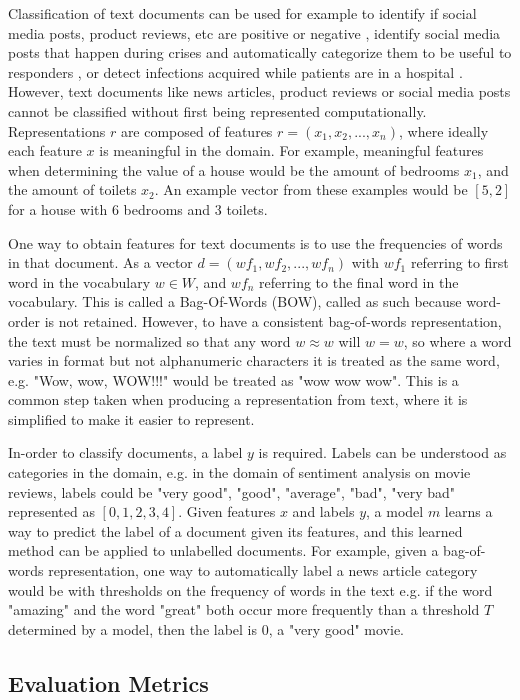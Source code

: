 Classification of text documents can be used for example to identify if social media posts, product reviews, etc are positive or negative \cite{Burel2018},  identify social media posts that happen during crises and automatically categorize them to be useful to responders \cite{Burel2018},  or detect infections acquired while patients are in a hospital . However, text documents like news articles, product reviews or social media posts cannot be classified without first being represented computationally.  Representations $r$ are composed of features $r = (x_1, x_2, ..., x_n)$, where ideally each feature $x$  is meaningful in the domain. For example, meaningful features when determining the  value of a house would be the amount of bedrooms $x_1$, and the amount of toilets $x_2$. An example vector from these examples would be $[5,2]$ for a house with 6 bedrooms and 3 toilets.

One way to obtain features for text documents is to use the frequencies of words in that document. As a vector $d = ({wf}_1, {wf}_2, ..., {wf}_n)$ with ${wf}_1$ referring to first word in the vocabulary $w \in W$, and ${wf}_n$  referring to the final word in the vocabulary. This is called a Bag-Of-Words (BOW), called as such because word-order is not retained. However, to have a consistent bag-of-words representation, the text must be normalized so that any word $w \approx w$ will  $w = w$, so where a word varies in format but not alphanumeric characters it is treated as the same word, e.g. "Wow, wow, WOW!!!" would be treated as  "wow wow wow". This is a common step taken when producing a representation from text, where it is simplified to make it easier to represent.

In-order to classify documents, a label $y$ is required. Labels can be understood as categories in the domain, e.g. in the domain of sentiment analysis on movie reviews, labels could be "very good", "good", "average", "bad", "very bad" represented as $[0, 1, 2, 3, 4]$. Given features $x$ and labels $y$, a model $m$ learns a way to predict the label of a document given its features, and this learned method can be applied to unlabelled documents. For example, given a bag-of-words representation, one way to automatically label a news article category would be with thresholds on the frequency of words in the text e.g. if the word "amazing" and the word "great" both occur more frequently than a threshold $T$ determined by a model, then the label is $0$,  a "very good" movie. 

\subsection{Evaluation Metrics}

